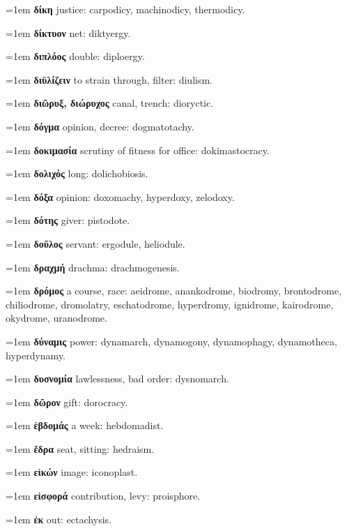 \hangindent=1em \textbf{δίκη} justice: carpodicy, machinodicy, thermodicy.\par
\hangindent=1em \textbf{δίκτυον} net: diktyergy.\par
\hangindent=1em \textbf{διπλόος} double: diploergy.\par
\hangindent=1em \textbf{διϋλίζειν} to strain through, filter: diulism.\par
\hangindent=1em \textbf{διῶρυξ, διώρυχος} canal, trench: dioryctic.\par
\hangindent=1em \textbf{δόγμα} opinion, decree: dogmatotachy.\par
\hangindent=1em \textbf{δοκιμασία} scrutiny of fitness for office: dokimastocracy.\par
\hangindent=1em \textbf{δολιχός} long: dolichobiosis.\par
\hangindent=1em \textbf{δόξα} opinion: doxomachy, hyperdoxy, zelodoxy.\par
\hangindent=1em \textbf{δότης} giver: pistodote.\par
\hangindent=1em \textbf{δοῦλος} servant: ergodule, heliodule.\par
\hangindent=1em \textbf{δραχμή} drachma: drachmogenesis.\par
\hangindent=1em \textbf{δρόμος} a course, race: aeidrome, anankodrome, biodromy, brontodrome, chiliodrome, dromolatry, eschatodrome, hyperdromy, ignidrome, kairodrome, okydrome, uranodrome.\par
\hangindent=1em \textbf{δύναμις} power: dynamarch, dynamogony, dynamophagy, dynamotheca, hyperdynamy.\par
\hangindent=1em \textbf{δυσνομία} lawlessness, bad order: dysnomarch.\par
\hangindent=1em \textbf{δῶρον} gift: dorocracy.\par
\hangindent=1em \textbf{ἑβδομάς} a week: hebdomadist.\par
\hangindent=1em \textbf{ἕδρα} seat, sitting: hedraism.\par
\hangindent=1em \textbf{εἰκών} image: iconoplast.\par
\hangindent=1em \textbf{εἰσφορά} contribution, levy: proisphore.\par
\hangindent=1em \textbf{ἐκ} out: ectachysis.\par
